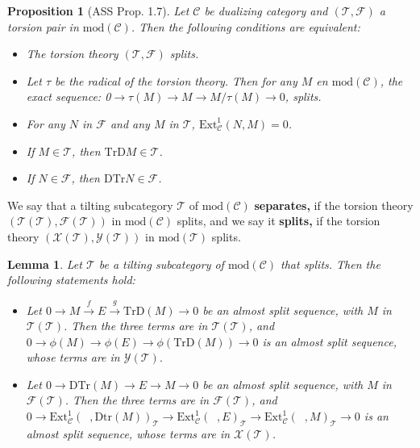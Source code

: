 \documentclass{amsart}
\theoremstyle{plain}
\newtheorem{lemma}{Lemma}
\newtheorem{proposition}{Proposition}
\numberwithin{equation}{section}
\begin{document}
\begin{proposition}[ASS Prop. 1.7]
\label{Brenner-B} Let $\mathcal{C}$ be dualizing category and $(\mathscr T,\mathscr F)$ a torsion pair in $\mathrm{mod}(\mathcal{C})$. Then the
following conditions are equivalent:

\begin{itemize}
\item[(a)] The torsion theory $(\mathscr T,\mathscr F)$ splits.

\item[(b)] Let $\tau$ be the radical of the torsion theory. Then for any $M$
en $\mathrm{mod}(\mathcal{C})$, the exact sequence: 0$\rightarrow
\tau(M)\rightarrow M\rightarrow M/\tau(M)\rightarrow 0$, splits.

\item[(c)] For any $N$ in $\mathscr F$ and any $M$ in $\mathscr T$, $\mathrm{Ext}^{1}_{\mathcal{C}}(N,M)=0$.

\item[(c)] If $M\in \mathscr T$, then $\mathrm{TrD}M\in \mathscr T$.

\item[(d)] If $N\in \mathscr F$, then $\mathrm{DTr}N\in \mathscr F$.
\end{itemize}
\end{proposition}

We say that a tilting subcategory $\mathcal{T}$ of $\mathrm{mod}(\mathcal{C}) $ \textbf{separates,} if the torsion theory $(\mathscr{T}(\mathcal{T}),\mathscr{F}(\mathcal{T}))$ in $\mathrm{mod}(\mathcal{C})$ splits, and we say
it \textbf{splits,} if the torsion theory $(\mathscr{X}(\mathcal{T}),\mathscr{Y}(\mathcal{T}))$ in $\mathrm{mod}(\mathcal{T})$ splits.

\begin{lemma}
\label{BrennerB9} Let $\mathcal{T}$ be a tilting subcategory of $\mathrm{mod}(\mathcal{C})$ that splits. Then the following statements hold:

\begin{itemize}
\item[(a)] Let $0\rightarrow M\xrightarrow{f}E\xrightarrow{g}\mathrm{TrD}(M)\rightarrow 0$ be an almost split sequence, with $M$ in $\mathscr{T}(\mathcal{T})$. Then the three terms are in $\mathscr{T}(\mathcal{T})$, and $0\rightarrow \phi (M)\rightarrow \phi (E)\rightarrow \phi (\mathrm{TrD}(M))\rightarrow 0$ is an almost split sequence, whose terms are in $\mathscr{Y}(\mathcal{T}).$

\item[(b)] Let $0\rightarrow \mathrm{DTr}(M)\rightarrow E\rightarrow
M\rightarrow 0$ be an almost split sequence, with $M$ in $\mathscr{F}(\mathcal{T})$. Then the three terms are in $\mathscr{F}(\mathcal{T})$, and $0\rightarrow \mathrm{Ext}^1_\mathcal{C}(\;\;,\mathrm{Dtr}(M))_{\mathcal{T}}\rightarrow \mathrm{Ext}^1_\mathcal{C}(\;\;,E)_{\mathcal{T}}\rightarrow
\mathrm{Ext}^1_\mathcal{C}(\;\;,M)_{\mathcal{T}}\rightarrow 0$ is an almost
split sequence, whose terms are in $\mathscr{X}(\mathcal{T})$.
\end{itemize}
\end{lemma}
\end{document}
